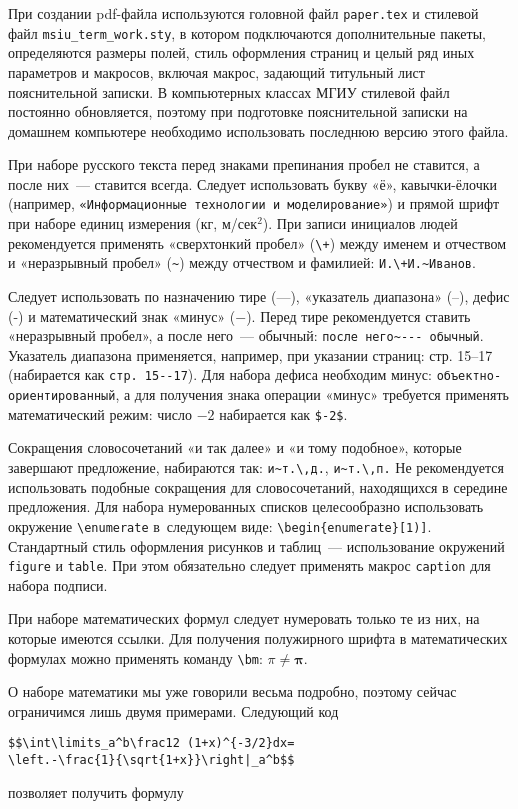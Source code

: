 При создании pdf-файла используются головной файл \texttt{paper.tex} и
стилевой файл \texttt{msiu\_term\_work.sty}, в котором подключаются
дополнительные
пакеты, определяются размеры полей, стиль оформления страниц и целый ряд иных
параметров и макросов, включая макрос, задающий титульный лист пояснительной
записки. В компьютерных классах МГИУ стилевой файл постоянно обновляется,
поэтому при подготовке пояснительной записки на домашнем компьютере необходимо
использовать последнюю версию этого файла.

При наборе русского текста перед знаками препинания пробел не ставится,
а после них~--- ставится всегда. Следует использовать букву «ё»,
кавычки-ёлочки
(например, \verb|«Информационные технологии и моделирование»|) и
прямой шрифт при наборе единиц измерения (кг, м/сек${}^2$).
При записи инициалов людей рекомендуется применять «сверхтонкий пробел»
(\verb|\+|) между именем и отчеством и «неразрывный пробел» (\verb|~|) между
отчеством и фамилией: \verb|И.\+И.~Иванов|.

Следует использовать по назначению тире
(---), «указатель диапазона» (--), дефис (-) и математический знак «минус»
($-$). Перед тире рекомендуется ставить «неразрывный
пробел», а после него~--- обычный: \verb|после него~--- обычный|. Указатель
диапазона применяется, например, при указании страниц: стр. 15--17
(набирается как \verb|стр. 15--17|). Для набора дефиса необходим минус:
\verb|объектно-ориентированный|, а для получения знака операции  «минус»
требуется применять математический режим: число $-2$ набирается как
\verb|$-2$|.

Сокращения словосочетаний «и так далее» и «и тому подобное», которые
завершают предложение, набираются так: \verb|и~т.\,д.|, \verb|и~т.\,п.|
Не рекомендуется использовать подобные сокращения для словосочетаний,
находящихся в середине предложения. Для набора нумерованных списков
целесообразно использовать окружение \verb|\enumerate| в~следующем виде:
\verb|\begin{enumerate}[1)]|.
Стандартный стиль оформления рисунков и таблиц~--- использование окружений
\verb|figure| и \verb|table|. При этом обязательно следует применять макрос
\verb|caption| для набора подписи.

При наборе математических формул следует нумеровать только те из них, на
которые имеются ссылки. Для получения полужирного шрифта в математических
формулах можно применять команду \verb|\bm|: $\pi \ne \bm\pi$.

О наборе математики мы уже говорили весьма подробно, поэтому сейчас
ограничимся лишь двумя примерами. Следующий код
\begin{small}
\begin{verbatim}
$$\int\limits_a^b\frac12 (1+x)^{-3/2}dx=
\left.-\frac{1}{\sqrt{1+x}}\right|_a^b$$
\end{verbatim}
\end{small}
\noindent позволяет получить формулу

